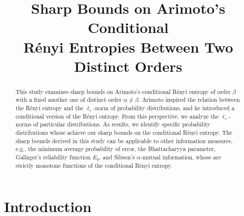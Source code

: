 \documentclass[conference, draftcls, onecolumn]{IEEEtran}
\theoremstyle{plain}
\begin{document}
\title{Sharp Bounds on Arimoto's Conditional \\ R\'{e}nyi Entropies Between Two Distinct Orders}

\IEEEoverridecommandlockouts

\author{%
%
}


\maketitle


\begin{abstract}
This study examines sharp bounds on Arimoto's conditional R\'{e}nyi entropy of order $\beta$ with a fixed another one of distinct order $\alpha \neq \beta$.
Arimoto inspired the relation between the R\'{e}nyi entropy and the $\ell_{r}$-norm of probability distributions, and he introduced a conditional version of the R\'{e}nyi entropy.
From this perspective, we analyze the $\ell_{r}$-norms of particular distributions. As results, we identify specific probability distributions whose achieve our sharp bounds on the conditional R\'{e}nyi entropy.
The sharp bounds derived in this study can be applicable to other information measures, e.g., the minimum average probability of error, the Bhattacharyya parameter, Gallager's reliability function $E_{0}$, and Sibson's $\alpha$-mutual information, whose are strictly monotone functions of the conditional R\'{e}nyi entropy.
\end{abstract}


\IEEEpeerreviewmaketitle



\section{Introduction}
\end{document}
